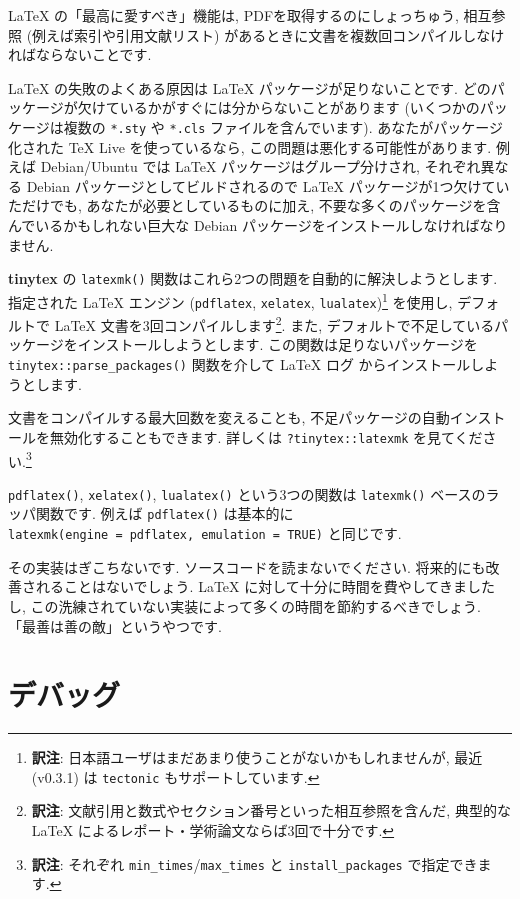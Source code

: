 \documentclass[
  xelatex,ja=standard,jafont=noto]{bxjsreport}
\begin{document}
LaTeX の「最高に愛すべき」機能は, PDFを取得するのにしょっちゅう,
相互参照 (例えば索引や引用文献リスト)
があるときに文書を複数回コンパイルしなければならないことです.

LaTeX の失敗のよくある原因は LaTeX パッケージが足りないことです.
どのパッケージが欠けているかがすぐには分からないことがあります
(いくつかのパッケージは複数の \texttt{*.sty} や \texttt{*.cls}
ファイルを含んでいます). あなたがパッケージ化された TeX Live
を使っているなら, この問題は悪化する可能性があります. 例えば
Debian/Ubuntu では LaTeX パッケージはグループ分けされ, それぞれ異なる
Debian パッケージとしてビルドされるので LaTeX
パッケージが1つ欠けていただけでも, あなたが必要としているものに加え,
不要な多くのパッケージを含んでいるかもしれない巨大な Debian
パッケージをインストールしなければなりません.

\textbf{tinytex} の \texttt{latexmk()}
関数はこれら2つの問題を自動的に解決しようとします. 指定された LaTeX
エンジン (\texttt{pdflatex}, \texttt{xelatex},
\texttt{lualatex})\footnote{\textbf{訳注}:
  日本語ユーザはまだあまり使うことがないかもしれませんが, 最近 (v0.3.1)
  は \texttt{tectonic} もサポートしています.} を使用し, デフォルトで
LaTeX 文書を3回コンパイルします\footnote{\textbf{訳注}:
  文献引用と数式やセクション番号といった相互参照を含んだ, 典型的な LaTeX
  によるレポート・学術論文ならば3回で十分です.}. また,
デフォルトで不足しているパッケージをインストールしようとします.
この関数は足りないパッケージを \texttt{tinytex::parse\_packages()}
関数を介して LaTeX ログ からインストールしようとします.

文書をコンパイルする最大回数を変えることも,
不足パッケージの自動インストールを無効化することもできます. 詳しくは
\texttt{?tinytex::latexmk} を見てください.\footnote{\textbf{訳注}:
  それぞれ \texttt{min\_times}/\texttt{max\_times} と
  \texttt{install\_packages} で指定できます.}

\texttt{pdflatex()}, \texttt{xelatex()}, \texttt{lualatex()}
という3つの関数は \texttt{latexmk()} ベースのラッパ関数です. 例えば
\texttt{pdflatex()} は基本的に
\texttt{latexmk(engine\ =\ \textquotesingle{}pdflatex\textquotesingle{},\ emulation\ =\ TRUE)}
と同じです.

その実装はぎこちないです. ソースコードを読まないでください.
将来的にも改善されることはないでしょう. LaTeX
に対して十分に時間を費やしてきましたし,
この洗練されていない実装によって多くの時間を節約するべきでしょう.
「最善は善の敵」というやつです.

\hypertarget{ux30c7ux30d0ux30c3ux30b0}{%
\section{デバッグ}\label{ux30c7ux30d0ux30c3ux30b0}}
\end{document}
